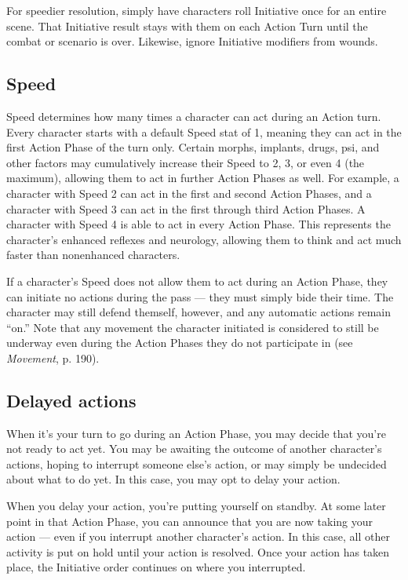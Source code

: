 For speedier resolution, simply have characters roll Initiative once for an entire scene. That Initiative result stays with them on each Action Turn until the combat or scenario is over. Likewise, ignore Initiative modifiers from wounds. 

\subsection{Speed} \label{sec:speed} 

Speed determines how many times a character can act during an Action turn. Every character starts with a default Speed stat of 1, meaning they can act in the first Action Phase of the turn only. Certain morphs, implants, drugs, psi, and other factors may cumulatively increase their Speed to 2, 3, or even 4 (the maximum), allowing them to act in further Action Phases as well. For example, a character with Speed 2 can act in the first and second Action Phases, and a character with Speed 3 can act in the first through third Action Phases. A character with Speed 4 is able to act in every Action Phase. This represents the character’s enhanced reflexes and neurology, allowing them to think and act much faster than nonenhanced characters. 

If a character’s Speed does not allow them to act during an Action Phase, they can initiate no actions during the pass --- they must simply bide their time. The character may still defend themself, however, and any automatic actions remain ``on.'' Note that any movement the character initiated is considered to still be underway even during the Action Phases they do not participate in (see \emph{Movement}, p. 190). 



\subsection{Delayed actions} \label{sec:delayed-actions} 

When it’s your turn to go during an Action Phase, you may decide that you’re not ready to act yet. You may be awaiting the outcome of another character’s actions, hoping to interrupt someone else’s action, or may simply be undecided about what to do yet. In this case, you may opt to delay your action. 

When you delay your action, you’re putting yourself on standby. At some later point in that Action Phase, you can announce that you are now taking your action --- even if you interrupt another character’s action. In this case, all other activity is put on hold until your action is resolved. Once your action has taken place, the Initiative order continues on where you interrupted. 

